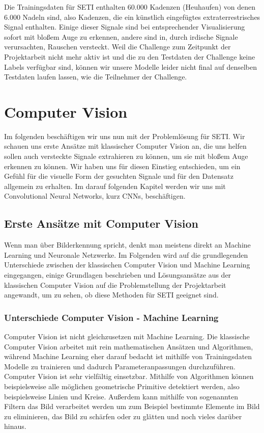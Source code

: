 \documentclass[12pt, a4paper]{article}
\begin{document}
Die Trainingsdaten für SETI enthalten 60.000 Kadenzen (Heuhaufen) von denen 6.000 Nadeln sind, also Kadenzen, die ein künstlich eingefügtes extraterrestrisches Signal enthalten. Einige dieser Signale sind bei entsprechender Visualisierung sofort mit bloßem Auge zu erkennen, andere sind in, durch irdische Signale verursachten, Rauschen versteckt. Weil die Challenge zum Zeitpunkt der Projektarbeit nicht mehr aktiv ist und die zu den Testdaten der Challenge keine Labels verfügbar sind, können wir unsere Modelle leider nicht final auf denselben Testdaten laufen lassen, wie die Teilnehmer der Challenge.

\section{Computer Vision}
Im folgenden beschäftigen wir uns nun mit der Problemlösung für SETI. Wir schauen uns erste Ansätze mit klassischer Computer Vision an, die uns helfen sollen auch versteckte Signale extrahieren zu können, um sie mit bloßem Auge erkennen zu können. Wir haben uns für diesen Einstieg entschieden, um ein Gefühl für die visuelle Form der gesuchten Signale und für den Datensatz allgemein zu erhalten. Im darauf folgenden Kapitel werden wir uns mit Convolutional Neural Networks, kurz CNNs, beschäftigen.

\subsection{Erste Ansätze mit Computer Vision}
Wenn man über Bilderkennung spricht, denkt man meistens direkt an Machine Learning und Neuronale Netzwerke. Im Folgenden wird auf die grundlegenden Unterschiede zwischen der klassischen Computer Vision und Machine Learning eingegangen, einige Grundlagen beschrieben und Lösungsansätze aus der klassischen Computer Vision auf die Problemstellung der Projektarbeit angewandt, um zu sehen, ob diese Methoden für SETI geeignet sind.

\subsubsection{Unterschiede Computer Vision - Machine Learning}
Computer Vision ist nicht gleichzusetzen mit Machine Learning. Die klassische Computer Vision arbeitet mit rein mathematischen Ansätzen und Algorithmen, während Machine Learning eher darauf bedacht ist mithilfe von Trainingsdaten Modelle zu trainieren und dadurch Parameteranpassungen durchzuführen. Computer Vision ist sehr vielfältig einsetzbar. Mithilfe von Algorithmen können beispielsweise alle möglichen geometrische Primitive detektiert werden, also beispielsweise Linien und Kreise. Außerdem kann mithilfe von sogenannten Filtern das Bild verarbeitet werden um zum Beispiel bestimmte Elemente im Bild zu eliminieren, das Bild zu schärfen oder zu glätten und noch vieles darüber hinaus.
\end{document}
